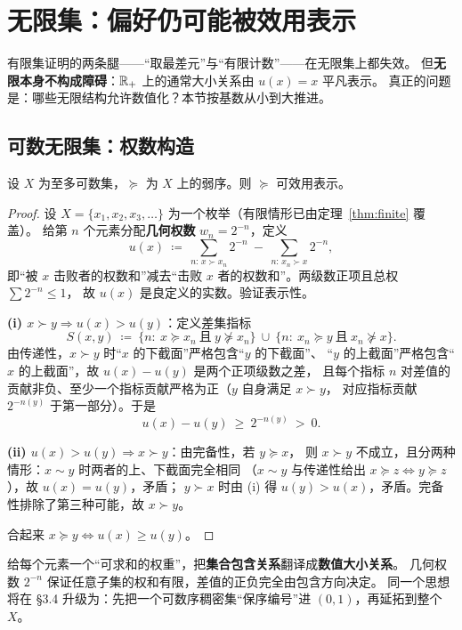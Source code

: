 \section{无限集：偏好仍可能被效用表示}

有限集证明的两条腿——“取最差元”与“有限计数”——在无限集上都失效。
但\textbf{无限本身不构成障碍}：$\mathbb{R}_+$ 上的通常大小关系由 $u(x)=x$ 平凡表示。
真正的问题是：哪些无限结构允许数值化？本节按基数从小到大推进。

\subsection{可数无限集：权数构造}

\begin{theorem}[可数集表示定理]\label{thm:countable}
设 $X$ 为至多可数集，$\succeq$ 为 $X$ 上的弱序。则 $\succeq$ 可效用表示。
\end{theorem}

\begin{proof}
设 $X=\{x_1,x_2,x_3,\dots\}$ 为一个枚举（有限情形已由定理~\ref{thm:finite} 覆盖）。
给第 $n$ 个元素分配\textbf{几何权数} $w_n=2^{-n}$，定义
\[
u(x)\ \coloneqq\ \sum_{n:\,x\succ x_n} 2^{-n}\ -\ \sum_{n:\,x_n\succ x} 2^{-n},
\]
即“被 $x$ 击败者的权数和”减去“击败 $x$ 者的权数和”。两级数正项且总权 $\sum 2^{-n}\le 1$，
故 $u(x)$ 是良定义的实数。验证表示性。

\textbf{(i) $x\succ y\Rightarrow u(x)>u(y)$}：定义差集指标
\[
S(x,y)\ \coloneqq\ \{n:\ x\succeq x_n\ \text{且}\ y\not\succeq x_n\}\ \cup\ \{n:\ x_n\succeq y\ \text{且}\ x_n\not\succeq x\}.
\]
由传递性，$x\succ y$ 时“$x$ 的下截面”严格包含“$y$ 的下截面”、
“$y$ 的上截面”严格包含“$x$ 的上截面”，故 $u(x)-u(y)$ 是两个正项级数之差，
且每个指标 $n$ 对差值的贡献非负、至少一个指标贡献严格为正（$y$ 自身满足 $x\succ y$，
对应指标贡献 $2^{-n(y)}$ 于第一部分）。于是
\[
u(x)-u(y)\ \ge\ 2^{-n(y)}\ >\ 0.
\]

\textbf{(ii) $u(x)>u(y)\Rightarrow x\succ y$}：由完备性，若 $y\succeq x$，
则 $x\succ y$ 不成立，且分两种情形：$x\sim y$ 时两者的上、下截面完全相同
（$x\sim y$ 与传递性给出 $x\succeq z\iff y\succeq z$），故 $u(x)=u(y)$，矛盾；
$y\succ x$ 时由 (i) 得 $u(y)>u(x)$，矛盾。完备性排除了第三种可能，故 $x\succ y$。

合起来 $x\succeq y\iff u(x)\ge u(y)$。
\end{proof}

\begin{remark}[权数构造的思想]
给每个元素一个“可求和的权重”，把\textbf{集合包含关系}翻译成\textbf{数值大小关系}。
几何权数 $2^{-n}$ 保证任意子集的权和有限，差值的正负完全由包含方向决定。
同一个思想将在 §3.4 升级为：先把一个可数序稠密集“保序编号”进 $(0,1)$，再延拓到整个 $X$。
\end{remark}

